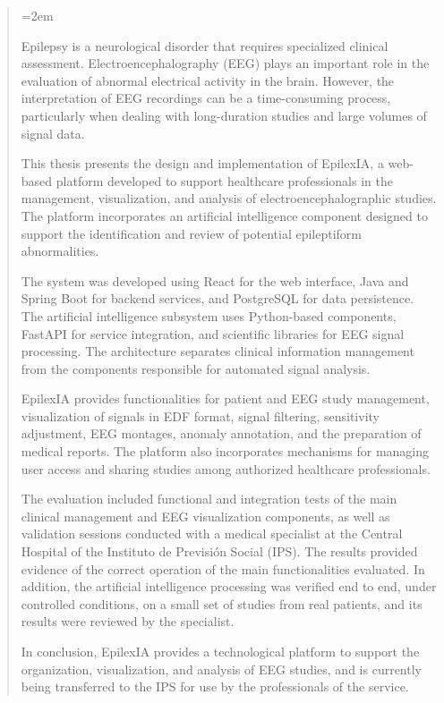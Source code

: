
\begin{abstract}
\small
\emergencystretch=2em

Epilepsy is a neurological disorder that requires
specialized clinical assessment. Electroencephalography
(EEG) plays an important role in the evaluation of
abnormal electrical activity in the brain. However,
the interpretation of EEG recordings can be a
time-consuming process, particularly when dealing
with long-duration studies and large volumes of
signal data.

This thesis presents the design and implementation
of EpilexIA, a web-based platform developed to
support healthcare professionals in the management,
visualization, and analysis of electroencephalographic
studies. The platform incorporates an artificial
intelligence component designed to support the
identification and review of potential epileptiform
abnormalities.

The system was developed using React for the web
interface, Java and Spring Boot for backend services,
and PostgreSQL for data persistence. The artificial
intelligence subsystem uses Python-based components,
FastAPI for service integration, and scientific
libraries for EEG signal processing. The architecture
separates clinical information management from the
components responsible for automated signal analysis.

EpilexIA provides functionalities for patient and
EEG study management, visualization of signals in
EDF format, signal filtering, sensitivity
adjustment, EEG montages, anomaly annotation, and
the preparation of medical reports. The platform
also incorporates mechanisms for managing user
access and sharing studies among authorized
healthcare professionals.

The evaluation included functional and integration
tests of the main clinical management and EEG
visualization components, as well as validation
sessions conducted with a medical specialist
at the Central Hospital of the Instituto de
Previsión Social (IPS). The results provided
evidence of the correct operation of the main
functionalities evaluated. In addition, the artificial intelligence processing was verified end to end, under controlled conditions, on a small set of studies from real patients, and its results were reviewed by the specialist.

In conclusion, EpilexIA provides a technological
platform to support the organization, visualization,
and analysis of EEG studies, and is currently being transferred to the IPS for use by the professionals of the service.

\end{abstract}

